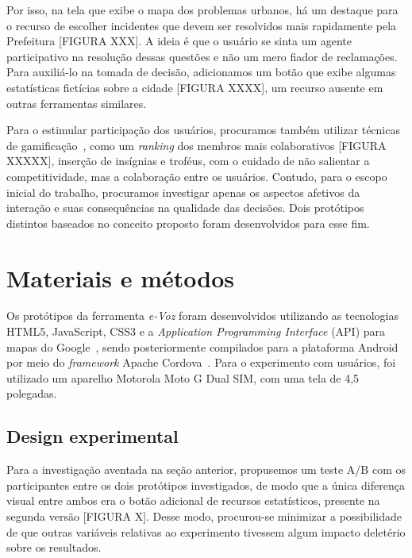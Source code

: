 \documentclass{sigchi}
\begin{document}
Por isso, na tela que exibe o mapa dos problemas urbanos, há um destaque para o recurso de escolher incidentes que devem ser resolvidos mais rapidamente pela Prefeitura [FIGURA XXX]. A ideia é que o usuário se sinta um agente participativo na resolução dessas questões e não um mero fiador de reclamações. Para auxiliá-lo na tomada de decisão, adicionamos um botão que exibe algumas estatísticas fictícias sobre a cidade [FIGURA XXXX], um recurso ausente em outras ferramentas similares.

Para o estimular participação dos usuários, procuramos também utilizar técnicas de gamificação~\cite{deterding:2011}, como um \textit{ranking} dos membros mais colaborativos [FIGURA XXXXX], inserção de insígnias e troféus, com o cuidado de não salientar a competitividade, mas a colaboração entre os usuários. Contudo, para o escopo inicial do trabalho, procuramos investigar apenas os aspectos afetivos da interação e suas consequências na qualidade das decisões. Dois protótipos distintos baseados no conceito proposto foram desenvolvidos para esse fim.



\section{Materiais e métodos}
Os protótipos da ferramenta \textit{e-Voz} foram desenvolvidos utilizando as tecnologias HTML5, JavaScript, CSS3 e a \textit{Application Programming Interface} (API) para mapas do Google~\cite{googlemaps:2016}, sendo posteriormente compilados para a plataforma Android por meio do \textit{framework} Apache Cordova~\cite{cordova:2016}. Para o experimento com usuários, foi utilizado um aparelho Motorola Moto G Dual SIM, com uma tela de 4,5 polegadas.

\subsection{Design experimental}
Para a investigação aventada na seção anterior, propusemos um teste A/B com os participantes entre os dois protótipos investigados, de modo que a única diferença visual entre ambos era o botão adicional de recursos estatísticos, presente na segunda versão [FIGURA X]. Desse modo, procurou-se minimizar a possibilidade de que outras variáveis relativas ao experimento tivessem algum impacto deletério sobre os resultados.
\end{document}
